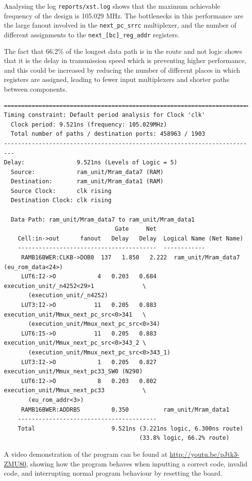 \documentclass[12pt,a4paper]{article}
\begin{document}
Analysing the log \texttt{reports/xst.log} shows that the maximum
achievable frequency of the design is 105.029 MHz. The bottlenecks in
this performance are the large fanout involved in the
\texttt{next\_pc\_srrc} multiplexer, and the number of different
assignments to the \texttt{next\_[bc]\_reg\_addr} registers.

The fact that 66.2\% of the longest data path is in the route and not
logic shows that it is the delay in transmission speed which is
preventing higher performance, and this could be increased by reducing
the number of different places in which registers are assigned,
leading to fewer input multiplexers and shorter paths between
components.

\newpage
\begin{verbatim}
=========================================================================
Timing constraint: Default period analysis for Clock 'clk'
  Clock period: 9.521ns (frequency: 105.029MHz)
  Total number of paths / destination ports: 458963 / 1903
-------------------------------------------------------------------------
Delay:               9.521ns (Levels of Logic = 5)
  Source:            ram_unit/Mram_data7 (RAM)
  Destination:       ram_unit/Mram_data1 (RAM)
  Source Clock:      clk rising
  Destination Clock: clk rising

  Data Path: ram_unit/Mram_data7 to ram_unit/Mram_data1
                                Gate     Net
    Cell:in->out      fanout   Delay   Delay  Logical Name (Net Name)
    ----------------------------------------  ------------
     RAMB16BWER:CLKB->DOB0  137   1.850   2.222  ram_unit/Mram_data7 (eu_rom_data<24>)
     LUT6:I2->O            4   0.203   0.684  execution_unit/_n4252<29>1              \
       (execution_unit/_n4252)
     LUT3:I2->O           11   0.205   0.883  execution_unit/Mmux_next_pc_src<0>341   \
       (execution_unit/Mmux_next_pc_src<0>34)
     LUT6:I5->O           11   0.205   0.883  execution_unit/Mmux_next_pc_src<0>343_2 \
       (execution_unit/Mmux_next_pc_src<0>343_1)
     LUT3:I2->O            1   0.205   0.827  execution_unit/Mmux_next_pc33_SW0 (N290)
     LUT6:I2->O            8   0.203   0.802  execution_unit/Mmux_next_pc33           \
       (eu_rom_addr<3>)
     RAMB16BWER:ADDRB5         0.350          ram_unit/Mram_data1
    ----------------------------------------
    Total                      9.521ns (3.221ns logic, 6.300ns route)
                                       (33.8% logic, 66.2% route)
\end{verbatim}

A video demonstration of the program can be found at
\url{http://youtu.be/pJtk3-ZMU80}, showing how the program behaves
when inputting a correct code, invalid code, and interrupting normal
program behaviour by resetting the board.
\end{document}
